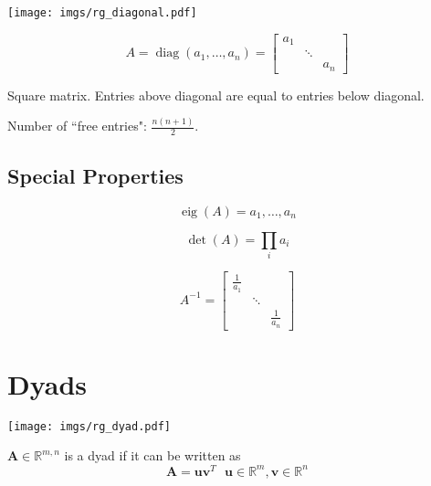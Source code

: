 \documentclass{book}
\newcommand{\mA}{\mathbf{A}}
\newcommand{\vu}{\mathbf{u}}
\newcommand{\vv}{\mathbf{v}}
\DeclareMathOperator{\diag}{diag}
\DeclareMathOperator{\eig}{eig}
\newcommand{\sRm}{\mathbb{R}^{m}}
\newcommand{\sRn}{\mathbb{R}^{n}}
\newcommand{\sRmn}{\mathbb{R}^{m,n}}
\begin{document}
\begin{center}
\texttt{[image: imgs/rg\_diagonal.pdf]}
\end{center}

\begin{equation}
A=\diag(a_1,\ldots,a_n)=
\begin{bmatrix}
a_1  &        &  \\
     & \ddots &  \\
     &        & a_n 
\end{bmatrix}
\end{equation}

Square matrix. Entries above diagonal are equal to entries below diagonal.

Number of ``free entries": $\frac{n(n+1)}{2}$.

\subsection*{Special Properties}

\begin{equation}
\eig(A)={a_1,\ldots,a_n}
\end{equation}

\begin{equation}
\det(A)=\prod_i a_i 
\end{equation}

\begin{equation}
A^{-1}=
\begin{bmatrix}
\frac{1}{a_1} &        &               \\
              & \ddots &               \\
              &        & \frac{1}{a_n}
\end{bmatrix}
\end{equation}




\section{Dyads}

\begin{center}
\texttt{[image: imgs/rg\_dyad.pdf]}
\end{center}

$\mA\in\sRmn$ is a dyad if it can be written as
\begin{equation}
\mA=\vu\vv^T~~~\vu\in\sRm, \vv\in\sRn
\end{equation}
\end{document}
